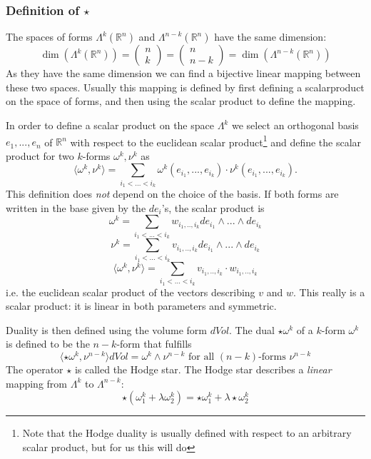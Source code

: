 \subsubsection{Definition of $\star$}
The spaces of forms $\Lambda^k(\mathbb R^n)$ and $\Lambda^{n-k}(\mathbb R^n)$ have the same dimension:
\[\dim(\Lambda^k(\mathbb R^n)) = \begin{pmatrix}
n \\ k
\end{pmatrix}= \begin{pmatrix}
n \\ n-k
\end{pmatrix} = \dim(\Lambda^{n-k}(\mathbb R^n))\]
As they have the same dimension we can find a bijective linear mapping between these two spaces. Usually this mapping is defined by first defining  a scalarproduct on the space of forms, and then using the scalar product to define the mapping. 

In order to define a scalar product on the space $\Lambda^k$ we select an orthogonal basis $e_1,...,e_n$ of $\mathbb R^n$ with respect to the euclidean scalar product\footnote{Note that the Hodge duality is usually defined with respect to an arbitrary scalar product, but for us this will do} and define the scalar product for two $k$-forms $\omega^k, \nu^k$ as
\[\langle \omega^k, \nu^k \rangle = \sum_{i_1 <...<i_k} \omega^k(e_{i_1},...,e_{i_k})\cdot \nu^k(e_{i_1},...,e_{i_k}).\]
This definition does \emph{not} depend on the choice of the basis. If both forms are written in the base given by the $de_i$'s, the scalar product is
\[\omega^k = \sum_{i_1<...<i_k}w_{i_1,..,i_k} de_{i_1}\wedge ...\wedge de_{i_k}\]
\[\nu^k = \sum_{i_1<...<i_k}v_{i_1,..,i_k} de_{i_1}\wedge ...\wedge de_{i_k}\]
\[\langle \omega^k, \nu^k\rangle = \sum_{i_1<...<i_k} v_{i_1,..,i_k} \cdot w_{i_1,..,i_k}\]
i.e. the euclidean scalar product of the vectors describing $v$ and $w$. This really is a scalar product: it is linear in both parameters and symmetric.

Duality is then defined using the volume form $dVol$. The dual $\star\omega^k$ of a $k$-form $\omega^k$ is defined to be the $n-k$-form that fulfills
\[\langle\star\omega^k, \nu^{n-k}\rangle dVol  = \omega^k \wedge \nu^{n-k} \text{ for all $(n-k)$-forms $\nu^{n-k}$}\] 
The operator $\star$ is called the Hodge star. The Hodge star describes a \emph{linear} mapping from $\Lambda^k$ to $\Lambda^{n-k}$:
 \[\star(\omega_1^k + \lambda \omega_2^k) = \star\omega_1^k + \lambda \star\omega_2^k \]

